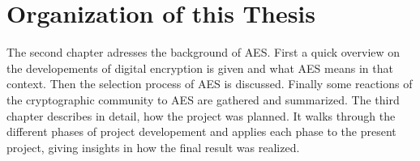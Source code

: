 \section{Organization of this Thesis}
\label{ch:organizationofthisthesis}

The second chapter adresses the background of \ac{AES}. First a quick overview on the developements of digital encryption is given and what \ac{AES} means in that context. Then the selection process of \ac{AES} is discussed. Finally some reactions of the cryptographic community to \ac{AES} are gathered and summarized.
The third chapter describes in detail, how the project was planned. It walks through the different phases of project developement and applies each phase to the present project, giving insights in how the final result was realized.
